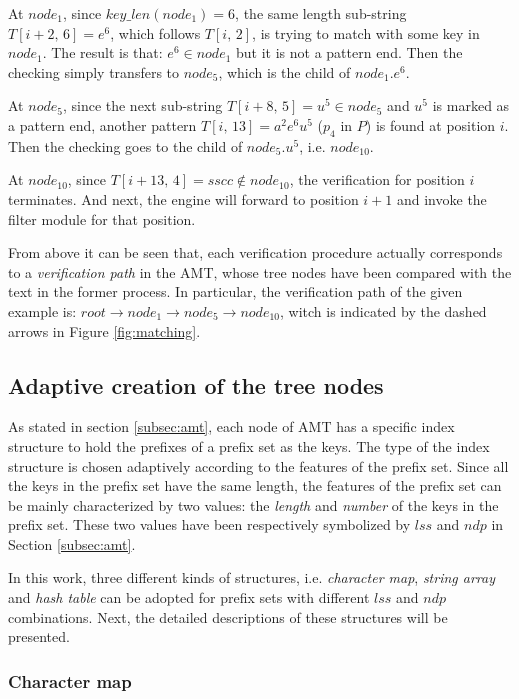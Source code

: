 At $node_1$, since $key\_len(node_1)=6$, the same length sub-string
$T[i+2,\,6]=e^6$, which follows $T[i,\,2]$, is trying to match with
some key in $node_1$. The result is that: $e^6 \in node_1$ but it is
not a pattern end. Then the checking simply transfers to $node_5$,
which is the child of $node_1.e^6$.

At $node_5$, since the next sub-string $T[i+8,\,5]=u^5 \in node_5$ and
$u^5$ is marked as a pattern end, another pattern
$T[i,\,13]=a^2e^6u^5$ ($p_4$ in $P$) is found at position $i$. Then
the checking goes to the child of $node_5.u^5$, i.e.  $node_{10}$.

At $node_{10}$, since $T[i+13,\,4]=sscc \notin node_{10}$, the
verification for position $i$ terminates. And next, the engine will
forward to position $i+1$ and invoke the filter module for that
position.

From above it can be seen that, each verification procedure actually
corresponds to a \emph{verification path} in the AMT, whose tree nodes
have been compared with the text in the former process. In particular,
the verification path of the given example is:
$root \rightarrow node_1 \rightarrow node_5 \rightarrow node_{10}$,
witch is indicated by the dashed arrows in Figure \ref{fig:matching}.


\subsection{Adaptive creation of the tree nodes}
\label{subsec:nodes}

As stated in section \ref{subsec:amt}, each node of AMT has a specific
index structure to hold the prefixes of a prefix set as the keys. The
type of the index structure is chosen adaptively according to the
features of the prefix set. Since all the keys in the prefix set have
the same length, the features of the prefix set can be mainly
characterized by two values: the \emph{length} and \emph{number} of
the keys in the prefix set. These two values have been respectively
symbolized by $lss$ and $ndp$ in Section \ref{subsec:amt}.

In this work, three different kinds of structures,
i.e. \emph{character map}, \emph{string array} and \emph{hash table}
can be adopted for prefix sets with different $lss$ and $ndp$
combinations. Next, the detailed descriptions of these structures will
be presented.

\subsubsection{Character map}


